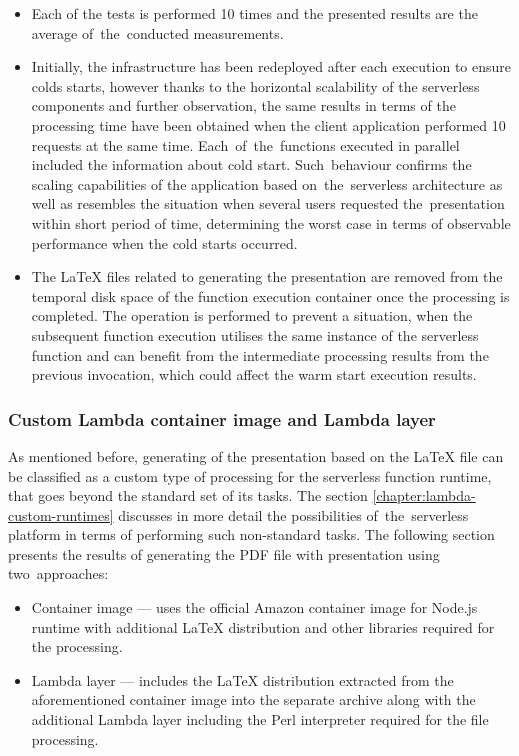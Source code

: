\begin{itemize}
   \item Each of the tests is performed 10 times and the presented results are the average of~the~conducted measurements.
   \item Initially, the infrastructure has been redeployed after each execution to ensure colds starts, however thanks to the horizontal scalability of the serverless components and further observation, the same results in terms of the processing time have been obtained when the client application performed 10 requests at the same time. 
   Each~of~the~functions executed in parallel included the information about cold start.
   Such~behaviour confirms the scaling capabilities of the application based on~the~serverless architecture as well as resembles the situation when several users requested the~presentation within short period of time, determining the worst case in terms of observable performance when the cold starts occurred.
   \item The LaTeX files related to generating the presentation are removed from the temporal disk space of the function execution container once the processing is completed.
   The operation is performed to prevent a situation, when the subsequent function execution utilises the same instance of the serverless function and can benefit from the intermediate processing results from the previous invocation, which could affect the warm start execution results.
\end{itemize}

\subsubsection{Custom Lambda container image and Lambda layer}

As mentioned before, generating of the presentation based on the LaTeX file can be classified as a custom type of processing for the serverless function runtime, that goes beyond the standard set of its tasks. The section \ref{chapter:lambda-custom-runtimes} discusses in more detail the possibilities of~the~serverless platform in terms of performing such non-standard tasks. The following section presents the results of generating the PDF file with presentation using two~approaches:

\begin{itemize}
   \item Container image --- uses the official Amazon container image for Node.js runtime with additional LaTeX distribution and other libraries required for the processing.
   \item Lambda layer --- includes the LaTeX distribution extracted from the aforementioned container image into the separate archive along with the additional Lambda layer including the Perl interpreter required for the file processing.
\end{itemize}


